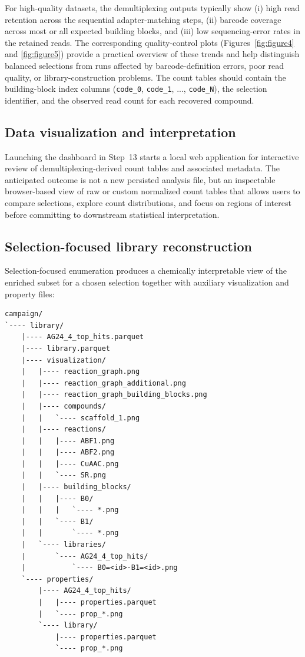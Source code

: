 For high-quality datasets, the demultiplexing outputs typically show (i) high read retention across the sequential adapter-matching steps, (ii) barcode coverage across most or all expected building blocks, and (iii) low sequencing-error rates in the retained reads. The corresponding quality-control plots (Figures~\ref{fig:figure4} and \ref{fig:figure5}) provide a practical overview of these trends and help distinguish balanced selections from runs affected by barcode-definition errors, poor read quality, or library-construction problems. The count tables should contain the building-block index columns (\texttt{code\_0}, \texttt{code\_1}, ..., \texttt{code\_N}), the selection identifier, and the observed read count for each recovered compound.

\subsection{Data visualization and interpretation}
Launching the dashboard in Step~13 starts a local web application for interactive review of demultiplexing-derived count tables and associated metadata. The anticipated outcome is not a new persisted analysis file, but an inspectable browser-based view of raw or custom normalized count tables that allows users to compare selections, explore count distributions, and focus on regions of interest before committing to downstream statistical interpretation.

\subsection{Selection-focused library reconstruction}
Selection-focused enumeration produces a chemically interpretable view of the enriched subset for a chosen selection together with auxiliary visualization and property files:

\begin{lstlisting}
campaign/
`---- library/
    |---- AG24_4_top_hits.parquet
    |---- library.parquet
    |---- visualization/
    |   |---- reaction_graph.png
    |   |---- reaction_graph_additional.png
    |   |---- reaction_graph_building_blocks.png
    |   |---- compounds/
    |   |   `---- scaffold_1.png
    |   |---- reactions/
    |   |   |---- ABF1.png
    |   |   |---- ABF2.png
    |   |   |---- CuAAC.png
    |   |   `---- SR.png
    |   |---- building_blocks/
    |   |   |---- B0/
    |   |   |   `---- *.png
    |   |   `---- B1/
    |   |       `---- *.png
    |   `---- libraries/
    |       `---- AG24_4_top_hits/
    |           `---- B0=<id>-B1=<id>.png
    `---- properties/
        |---- AG24_4_top_hits/
        |   |---- properties.parquet
        |   `---- prop_*.png
        `---- library/
            |---- properties.parquet
            `---- prop_*.png
\end{lstlisting}

